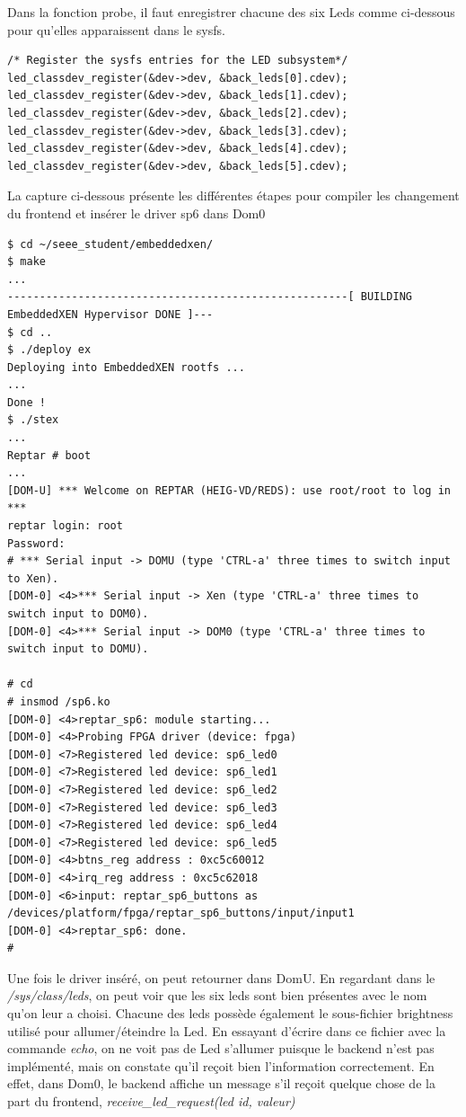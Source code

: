 Dans la fonction probe, il faut enregistrer chacune des six Leds comme ci-dessous pour qu'elles apparaissent dans le sysfs.
\begin{lstlisting}
/* Register the sysfs entries for the LED subsystem*/
led_classdev_register(&dev->dev, &back_leds[0].cdev);
led_classdev_register(&dev->dev, &back_leds[1].cdev);
led_classdev_register(&dev->dev, &back_leds[2].cdev);
led_classdev_register(&dev->dev, &back_leds[3].cdev);
led_classdev_register(&dev->dev, &back_leds[4].cdev);
led_classdev_register(&dev->dev, &back_leds[5].cdev);
\end{lstlisting}
La capture ci-dessous présente les différentes étapes pour compiler les changement du frontend et insérer le driver sp6 dans Dom0
\begin{lstlisting}
$ cd ~/seee_student/embeddedxen/
$ make
...
-----------------------------------------------------[ BUILDING EmbeddedXEN Hypervisor DONE ]---
$ cd ..
$ ./deploy ex
Deploying into EmbeddedXEN rootfs ...
...
Done !
$ ./stex
...
Reptar # boot
...
[DOM-U] *** Welcome on REPTAR (HEIG-VD/REDS): use root/root to log in ***
reptar login: root
Password: 
# *** Serial input -> DOMU (type 'CTRL-a' three times to switch input to Xen).
[DOM-0] <4>*** Serial input -> Xen (type 'CTRL-a' three times to switch input to DOM0).
[DOM-0] <4>*** Serial input -> DOM0 (type 'CTRL-a' three times to switch input to DOMU).

# cd
# insmod /sp6.ko
[DOM-0] <4>reptar_sp6: module starting...
[DOM-0] <4>Probing FPGA driver (device: fpga)
[DOM-0] <7>Registered led device: sp6_led0
[DOM-0] <7>Registered led device: sp6_led1
[DOM-0] <7>Registered led device: sp6_led2
[DOM-0] <7>Registered led device: sp6_led3
[DOM-0] <7>Registered led device: sp6_led4
[DOM-0] <7>Registered led device: sp6_led5
[DOM-0] <4>btns_reg address : 0xc5c60012
[DOM-0] <4>irq_reg address : 0xc5c62018
[DOM-0] <6>input: reptar_sp6_buttons as /devices/platform/fpga/reptar_sp6_buttons/input/input1
[DOM-0] <4>reptar_sp6: done.
#
\end{lstlisting}
Une fois le driver inséré, on peut retourner dans DomU. En regardant dans le \textit{/sys/class/leds}, on peut voir que les six leds sont bien présentes avec le nom qu'on leur a choisi. Chacune des leds possède également le sous-fichier brightness utilisé pour allumer/éteindre la Led.
En essayant d'écrire dans ce fichier avec la commande \textit{echo}, on ne voit pas de Led s'allumer puisque le backend n'est pas implémenté, mais on constate qu'il reçoit bien l'information correctement. En effet, dans Dom0, le backend affiche un message s'il reçoit quelque chose de la part du frontend, \textit{receive\_led\_request(led id, valeur)}
